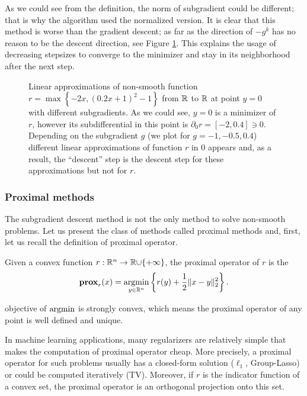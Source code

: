 As we could see from the definition, the norm of subgradient could be different; that is why the algorithm used the normalized version. It is clear that this method is worse than the gradient descent; as far as the direction of $-g^k$ has no reason to be the descent direction, see Figure \ref{fig:nonsmooth_approx}. This explains the usage of decreasing stepsizes to converge to the minimizer and stay in its neighborhood after the next step.


\begin{figure}[H]
    \centering
    
    \caption{Linear approximations of non-smooth function $r = \max\left\{-2x, (0.2x+1)^2 - 1\right\}$ from $\mathbb{R}$ to $\mathbb{R}$
    at point $y = 0$ with different subgradients. As we could see, $y=0$ is a minimizer of $r$, however its subdifferential in this point is $\partial_0 r = [-2, 0.4]\ni0$. Depending on the subgradient $g$ (we plot for $g=-1, -0.5, 0.4$) different linear approximations of function $r$ in $0$ appears and, as a result, the ``descent'' step is the descent step for these approximations but not for $r$.}
    \label{fig:nonsmooth_approx}
\end{figure}


\subsubsection{Proximal methods}
The subgradient descent method is not the only method to solve non-smooth problems. Let us present the class of methods called proximal methods and, first, let us recall the definition of  proximal operator.

\begin{definition}\label{def:proximal_operator}
Given a convex function $r:\mathbb{R}^n\rightarrow \mathbb{R}{\cup\{+\infty\}}$, the proximal operator of $r$ is the 
\begin{equation}\label{eq:prox}
\mathbf{prox}_r(x) = \operatorname*{argmin}_{y\in\mathbb{R}^n}\left\{r(y) + \frac{1}{2}\|x-y\|_2^2\right\}.
\end{equation}
\end{definition}
 objective of $\operatorname*{argmin}$ is  strongly convex, which means the proximal operator of any point is well defined and unique.

In machine learning applications, many regularizers are relatively simple that makes the computation of proximal operator cheap. More precisely, a proximal operator for such problems usually has a closed-form solution ($\ell_1$, Group-Lasso) or could be computed iteratively (TV). Moreover, if $r$ is the indicator function of a convex set, the proximal operator is an orthogonal projection onto this set. 

